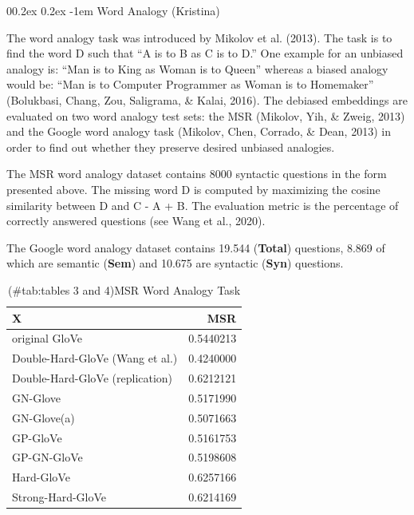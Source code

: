 \documentclass[
  english,
  man,floatsintext]{apa6}
\makeatletter
\let\oldparagraph\paragraph
\renewcommand{\paragraph}[1]{\oldparagraph{#1}\mbox{}}
\renewcommand{\paragraph}{\@startsection{paragraph}{4}{\parindent}%
  {0\baselineskip \@plus 0.2ex \@minus 0.2ex}%
  {-1em}%
  {\normalfont\normalsize\bfseries\itshape\typesectitle}}
\makeatother
\begin{document}
\hypertarget{word-analogy-kristina}{%
\paragraph{Word Analogy (Kristina)}\label{word-analogy-kristina}}

The word analogy task was introduced by Mikolov et al. (2013). The task is to find the word D such that ``A is to B as C is to D.'' One example for an unbiased analogy is: ``Man is to King as Woman is to Queen'' whereas a biased analogy would be: ``Man is to Computer Programmer as Woman is to Homemaker'' (Bolukbasi, Chang, Zou, Saligrama, \& Kalai, 2016). The debiased embeddings are evaluated on two word analogy test sets: the MSR (Mikolov, Yih, \& Zweig, 2013) and the Google word analogy task (Mikolov, Chen, Corrado, \& Dean, 2013) in order to find out whether they preserve desired unbiased analogies.

The MSR word analogy dataset contains 8000 syntactic questions in the form presented above. The missing word D is computed by maximizing the cosine similarity between D and C - A + B. The evaluation metric is the percentage of correctly answered questions (see Wang et al., 2020).

The Google word analogy dataset contains 19.544 (\textbf{Total}) questions, 8.869 of which are semantic (\textbf{Sem}) and 10.675 are syntactic (\textbf{Syn}) questions.

\begin{table}

\caption{(\#tab:tables 3 and 4)MSR Word Analogy Task}
\centering
\begin{tabular}[t]{l|r}
\hline
X & MSR\\
\hline
original GloVe & 0.5440213\\
\hline
Double-Hard-GloVe (Wang et al.) & 0.4240000\\
\hline
Double-Hard-GloVe (replication) & 0.6212121\\
\hline
GN-Glove & 0.5171990\\
\hline
GN-Glove(a) & 0.5071663\\
\hline
GP-GloVe & 0.5161753\\
\hline
GP-GN-GloVe & 0.5198608\\
\hline
Hard-GloVe & 0.6257166\\
\hline
Strong-Hard-GloVe & 0.6214169\\
\hline
\end{tabular}
\end{table}
\end{document}
